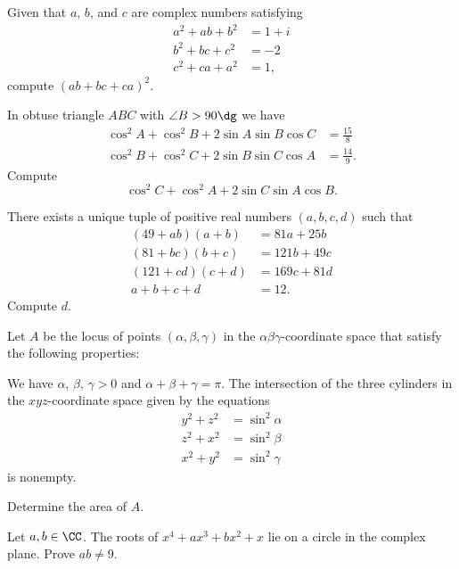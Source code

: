 \documentclass[11pt]{scrartcl}
\begin{document}
\begin{problem}[HMMT 2014/A9]
    Given that $a$, $b$, and $c$ are complex numbers satisfying
    \begin{align*}
        a^2 + ab + b^2 &= 1 + i \\
        b^2 + bc + c^2 &= -2 \\
        c^2 + ca + a^2 &= 1,
    \end{align*}
    compute $(ab + bc + ca)^2$.
\end{problem}

\begin{problem}[AIME II 2013/15]
    In obtuse triangle $ABC$ with $\angle B > 90\dg$ we have
    \begin{align*}
        \cos^2 A + \cos^2 B + 2 \sin A \sin B \cos C &= \frac{15}{8} \\
        \cos^2 B + \cos^2 C + 2 \sin B \sin C \cos A &= \frac{14}{9}.
    \end{align*}
    Compute
    \[\cos^2 C + \cos^2 A + 2 \sin C \sin A \cos B.\]
\end{problem}

\begin{problem}
    There exists a unique tuple of positive real numbers $(a,b,c,d)$ such that
    \begin{align*}
        (49 + ab)(a + b) &= 81a + 25b \\
        (81 + bc)(b + c) &= 121b + 49c \\
        (121 + cd)(c + d) &= 169c + 81d \\
        a + b + c + d &= 12.
    \end{align*}
    Compute $d$.
\end{problem}

\begin{problem}[Prize 2022/18]
    Let $A$ be the locus of points $(\alpha, \beta, \gamma)$ in the $\alpha\beta\gamma$-coordinate space that satisfy the following properties:

    \begin{itemize}
        \ii We have $\alpha$, $\beta$, $\gamma > 0$ and $\alpha + \beta + \gamma = \pi$.
        \ii The intersection of the three cylinders in the $xyz$-coordinate space given by the equations
        \begin{align*}
            y^2 + z^2 &= \sin^2 \alpha \\
            z^2 + x^2 &= \sin^2 \beta \\
            x^2 + y^2 &= \sin^2 \gamma
        \end{align*}
        is nonempty.
    \end{itemize}

    Determine the area of $A$.
\end{problem}

\begin{problem}[HMMT 2022/T6]
    Let $a,b \in \CC$. The roots of $x^4 + ax^3 + bx^2 + x$ lie on a circle in the complex plane. Prove $ab \neq 9$.
\end{problem}
\end{document}
